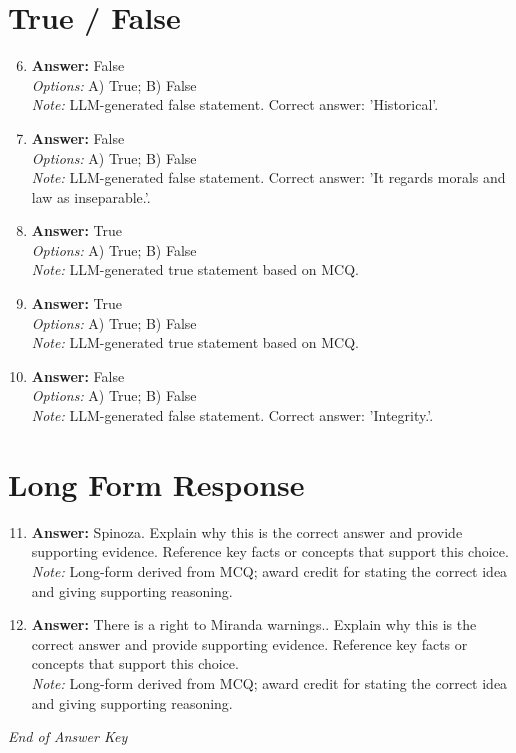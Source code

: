 \documentclass[12pt]{article}
\begin{document}
\section*{True / False}
\begin{enumerate}[label=\arabic*.]
\setcounter{enumi}{5}
\item \textbf{Answer:} False
\\ \textit{Options:} A) True; B) False
\\ \textit{Note:} LLM-generated false statement. Correct answer: 'Historical'.
\item \textbf{Answer:} False
\\ \textit{Options:} A) True; B) False
\\ \textit{Note:} LLM-generated false statement. Correct answer: 'It regards morals and law as inseparable.'.
\item \textbf{Answer:} True
\\ \textit{Options:} A) True; B) False
\\ \textit{Note:} LLM-generated true statement based on MCQ.
\item \textbf{Answer:} True
\\ \textit{Options:} A) True; B) False
\\ \textit{Note:} LLM-generated true statement based on MCQ.
\item \textbf{Answer:} False
\\ \textit{Options:} A) True; B) False
\\ \textit{Note:} LLM-generated false statement. Correct answer: 'Integrity.'.
\end{enumerate}

\section*{Long Form Response}
\begin{enumerate}[label=\arabic*.]
\setcounter{enumi}{10}
\item \textbf{Answer:} Spinoza. Explain why this is the correct answer and provide supporting evidence. Reference key facts or concepts that support this choice.
\\ \textit{Note:} Long-form derived from MCQ; award credit for stating the correct idea and giving supporting reasoning.
\item \textbf{Answer:} There is a right to Miranda warnings.. Explain why this is the correct answer and provide supporting evidence. Reference key facts or concepts that support this choice.
\\ \textit{Note:} Long-form derived from MCQ; award credit for stating the correct idea and giving supporting reasoning.
\end{enumerate}

\vfill
\noindent\textit{End of Answer Key}
\end{document}
